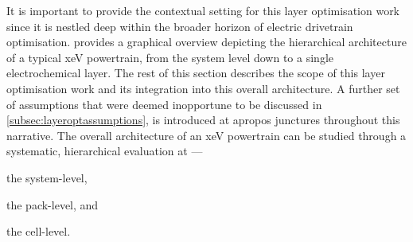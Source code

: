 

It is  important to provide the  contextual setting for this  layer optimisation
work since it is nestled deep  within the broader horizon of electric drivetrain
optimisation.   provides a  graphical overview
depicting the hierarchical architecture of  a typical \gls{xeV} powertrain, from
the  system level  down to  a  single electrochemical  layer. The  rest of  this
section describes the scope of this  layer optimisation work and its integration
into this  overall architecture. A further  set of assumptions that  were deemed
inopportune to be discussed  in \cref{subsec:layeroptassumptions}, is introduced
at apropos junctures  throughout this narrative. The overall  architecture of an
\gls{xeV}  powertrain  can  be  studied through  a  systematic,  hierarchical
evaluation at ---
\begin{enumerate*}[label=\itshape\alph*\upshape)]
    \item the system-level,
    \item the pack-level, and
    \item the cell-level.
\end{enumerate*}

